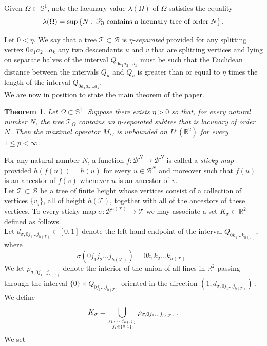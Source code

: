 \documentclass[12pt]{amsart}
\numberwithin{equation}{section}
\newtheorem{thm}{Theorem}
\theoremstyle{definition}
\theoremstyle{remark}
\begin{document}
Given $\Omega \subset \mathbb{S}^1$, note the lacunary value $\lambda(\Omega)$ of $\Omega$ satisfies the equality 
$$\lambda(\Omega) = \sup\left\{N : \mathscr{T}_\Omega  \;\textup{contains a lacunary tree of order}\; N\right\}.$$

Let $0 < \eta$.   We say that a tree $\mathscr{T} \subset \mathscr{B}$ is \emph{$\eta$-separated} provided for any splitting vertex $0a_1a_2\ldots a_k$ any two descendants $u$ and $v$ that are splitting vertices and lying on separate halves of the interval $Q_{0a_1a_2\ldots a_k}$ must be such that the  Euclidean distance between the intervals $Q_u$ and $Q_v$ is greater than or equal to $\eta$ times the length of the interval $Q_{0a_1a_2\ldots a_k}$. 
\\

We are now in position to state the main theorem of the paper.

\begin{thm}\label{t1}
Let $\Omega \subset \mathbb{S}^{1}$.   Suppose there exists $\eta > 0$ so that, for every natural number $N$, the tree $\mathscr{T}_\Omega$ contains an $\eta$-separated subtree that is lacunary of order $N$.   Then the maximal operator $M_\Omega$ is unbounded on $L^p(\mathbb{R}^2)$ for every $1 \leq p < \infty$.   
\end{thm}

For any natural number $N$, a function $f: \mathscr{B}^N \rightarrow \mathscr{B}^N$ is called a \emph{sticky map} provided $h(f(u)) = h(u)$ for every $u \in \mathscr{B}^N$ and moreover such that $f(u)$ is an ancestor of $f(v)$ whenever $u$ is an ancestor of $v$.
\\

Let $\mathscr{T} \subset \mathscr{B}$ be a tree of finite height whose vertices consist of a collection of vertices $\{v_j\}$, all of height $h(\mathscr{T})$, together with all of the ancestors of these vertices.  To every sticky map $\sigma:\mathscr{B}^{h(\mathscr{T})} \rightarrow \mathscr{T}$   we may associate a set $K_{\sigma} \subset \mathbb{R}^2$ defined as follows. 
\\

 Let $d_{\sigma, 0 j_1 \ldots j_{h(\mathscr{T})}} \in [0,1]$ denote the left-hand endpoint of the interval $Q_{0 k_1 \ldots k_{h(\mathscr{T})}}$, where 
 $$\sigma(0 j_1 j_2 \ldots j_{h(\mathscr{T})}) = 0 k_1 k_2 \ldots k_{h(\mathscr{T})}\;.$$  We let $\rho_{\sigma, 0 j_1  \ldots j_{h(\mathscr{T})}}$ denote the interior of the union of all lines in $\mathbb{R}^2$ passing through the interval $\{0\} \times Q_{0 j_1\ldots j_{h(\mathscr{T})}}$ oriented in the direction  $(1, d_{\sigma, 0 j_1 \ldots j_{h(\mathscr{T})}})\;.$ We define 
$$K_\sigma = \bigcup_{j_1, \ldots, j_{h(\mathscr{T})} \atop   j_i \in \{0,1\} } \rho_{\sigma, 0 j_1  \ldots j_{h(\mathscr{T})}}\;.$$  We set
\end{document}
